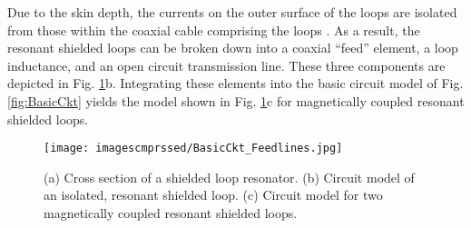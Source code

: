 \documentclass[journal]{IEEEtran}
\begin{document}
Due to the skin depth, the currents on the outer surface of the loops are isolated from those within the coaxial cable comprising the loops \cite{ShieldedLoop-Stendgaard}. As a result, the resonant shielded loops can be broken down into a coaxial ``feed'' element, a loop inductance, and an open circuit transmission line. These three components are depicted in Fig. \ref{fig:circuit}b. Integrating these elements into the basic circuit model of Fig. \ref{fig:BasicCkt} yields the model shown in Fig. \ref{fig:circuit}c for magnetically coupled resonant shielded loops.
\begin{figure}[htbp]
    \centering
    \texttt{[image: imagescmprssed/BasicCkt\_Feedlines.jpg]}
    \caption{(a) Cross section of a shielded loop resonator. (b) Circuit model of an isolated, resonant shielded loop. (c) Circuit model for two magnetically coupled resonant shielded loops.}
    \label{fig:circuit}
\end{figure}
\end{document}
